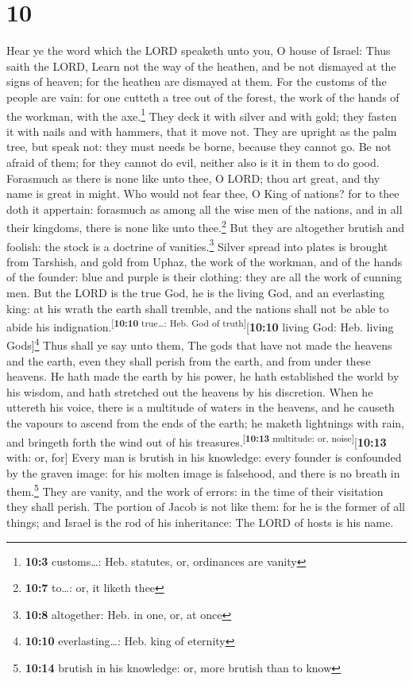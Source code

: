 \hypertarget{section-9}{%
\section{10}\label{section-9}}

 Hear ye the word which the LORD speaketh unto you, O
house of Israel:  Thus saith the LORD, Learn not the way
of the heathen, and be not dismayed at the signs of heaven; for the
heathen are dismayed at them.  For the customs of the
people are vain: for one cutteth a tree out of the forest, the work of
the hands of the workman, with the axe.\footnote{\textbf{10:3}
  customs\ldots: Heb. statutes, or, ordinances are vanity}
 They deck it with silver and with gold; they fasten it
with nails and with hammers, that it move not.  They are
upright as the palm tree, but speak not: they must needs be borne,
because they cannot go. Be not afraid of them; for they cannot do evil,
neither also is it in them to do good.  Forasmuch as there
is none like unto thee, O LORD; thou art great, and thy name is great in
might.  Who would not fear thee, O King of nations? for to
thee doth it appertain: forasmuch as among all the wise men of the
nations, and in all their kingdoms, there is none like unto
thee.\footnote{\textbf{10:7} to\ldots: or, it liketh thee}
 But they are altogether brutish and foolish: the stock is
a doctrine of vanities.\footnote{\textbf{10:8} altogether: Heb. in one,
  or, at once}  Silver spread into plates is brought from
Tarshish, and gold from Uphaz, the work of the workman, and of the hands
of the founder: blue and purple is their clothing: they are all the work
of cunning men.  But the LORD is the true God, he is the
living God, and an everlasting king: at his wrath the earth shall
tremble, and the nations shall not be able to abide his
indignation.\textsuperscript{{[}\textbf{10:10} true\ldots: Heb. God of
truth{]}}{[}\textbf{10:10} living God: Heb. living Gods{]}\footnote{\textbf{10:10}
  everlasting\ldots: Heb. king of eternity}  Thus shall
ye say unto them, The gods that have not made the heavens and the earth,
even they shall perish from the earth, and from under these heavens.
 He hath made the earth by his power, he hath established
the world by his wisdom, and hath stretched out the heavens by his
discretion.  When he uttereth his voice, there is a
multitude of waters in the heavens, and he causeth the vapours to ascend
from the ends of the earth; he maketh lightnings with rain, and bringeth
forth the wind out of his treasures.\textsuperscript{{[}\textbf{10:13}
multitude: or, noise{]}}{[}\textbf{10:13} with: or, for{]}
 Every man is brutish in his knowledge: every founder is
confounded by the graven image: for his molten image is falsehood, and
there is no breath in them.\footnote{\textbf{10:14} brutish in his
  knowledge: or, more brutish than to know}  They are
vanity, and the work of errors: in the time of their visitation they
shall perish.  The portion of Jacob is not like them: for
he is the former of all things; and Israel is the rod of his
inheritance: The LORD of hosts is his name.

